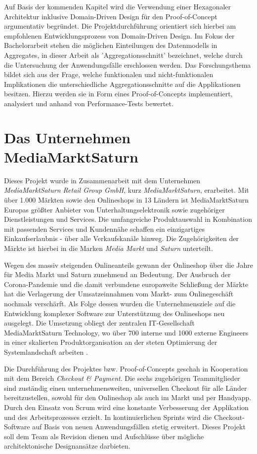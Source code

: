 Auf Basis der kommenden Kapitel wird die Verwendung einer Hexagonaler Architektur inklusive Domain-Driven Design für den Proof-of-Concept argumentativ begründet. Die Projektdurchführung orientiert sich hierbei am empfohlenen Entwicklungsprozess von Domain-Driven Design. Im Fokus der Bachelorarbeit stehen die möglichen Einteilungen des Datenmodells in Aggregates, in dieser Arbeit als 'Aggregationsschnitt' bezeichnet, welche durch die Untersuchung der Anwendungsfälle erschlossen werden. Das Forschungsthema bildet sich aus der Frage, welche funktionalen und nicht-funktionalen Implikationen die unterschiedliche Aggregationsschnitte auf die Applikationen besitzen. Hierzu werden sie in Form eines Proof-of-Concepts implementiert, analysiert und anhand von Performance-Tests bewertet.

\section{Das Unternehmen MediaMarktSaturn}

Dieses Projekt wurde in Zusammenarbeit mit dem Unternehmen \emph{MediaMarktSaturn Retail Group GmbH}, kurz \emph{MediaMarktSaturn}, erarbeitet. Mit über 1.000 Märkten sowie den Onlineshops in 13 Ländern ist MediaMarktSaturn Europas größter Anbieter von Unterhaltungselektronik sowie zugehöriger Dienstleistungen und Services. Die umfangreiche Produktauswahl in Kombination mit passenden Services und Kundennähe schaffen ein einzigartiges Einkaufserlaubnis - über alle Verkaufskanäle hinweg. Die Zugehörigkeiten der Märkte ist hierbei in die Marken \emph{Media Markt} und \emph{Saturn} unterteilt. \cite{mms.Unternehmen}

Wegen des massiv steigenden Onlineanteils gewann der Onlineshop über die Jahre für Media Markt und Saturn zunehmend an Bedeutung. Der Ausbruch der Corona-Pandemie und die damit verbundene europaweite Schließung der Märkte hat die Verlagerung der Umsatzeinnahmen vom Markt- zum Onlinegeschäft nochmals verschärft. Als Folge dessen wurden die Unternehmensziele auf die Entwicklung komplexer Software zur Unterstützung des Onlineshops neu ausgelegt. Die Umsetzung obliegt der zentralen IT-Gesellschaft MediaMarktSaturn Technology, wo über 700 interne und 1000 externe Engineers in einer skalierten Produktorganisation an der steten Optimierung der Systemlandschaft arbeiten \cite{mms.technology}.

Die Durchführung des Projektes bzw. Proof-of-Concepts geschah in Kooperation mit dem Bereich \emph{Checkout \& Payment}. Die sechs zugehörigen Teammitglieder sind zuständig einen unternehmensweiten, universellen Checkout für alle Länder bereitzustellen, sowohl für den Onlineshop als auch im Markt und per Handyapp. Durch den Einsatz von \Gls{Scrum} wird eine konstante Verbesserung der Applikation und des Arbeitsprozesses erzielt. In kontinuierlichen \Glspl{Sprint} wird die Checkout-Software auf Basis von neuen Anwendungsfällen stetig erweitert. Dieses Projekt soll dem Team als Revision dienen und Aufschlüsse über mögliche architektonische Designansätze darbieten.


